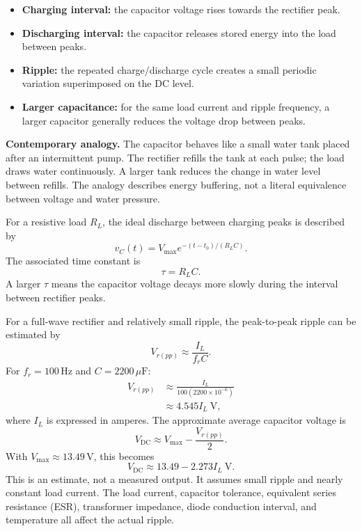 \documentclass[journal,12pt,twocolumn]{IEEEtran}
\begin{document}
\begin{itemize}[leftmargin=1.5em]
    \item \textbf{Charging interval:} the capacitor voltage rises
    towards the rectifier peak.
    \item \textbf{Discharging interval:} the capacitor releases stored
    energy into the load between peaks.
    \item \textbf{Ripple:} the repeated charge/discharge cycle creates
    a small periodic variation superimposed on the DC level.
    \item \textbf{Larger capacitance:} for the same load current and
    ripple frequency, a larger capacitor generally reduces the
    voltage drop between peaks.
\end{itemize}

\textbf{Contemporary analogy.} The capacitor behaves like a small
water tank placed after an intermittent pump. The rectifier refills
the tank at each pulse; the load draws water continuously. A larger
tank reduces the change in water level between refills. The analogy
describes energy buffering, not a literal equivalence between
voltage and water pressure.

For a resistive load $R_L$, the ideal discharge between charging
peaks is described by
\begin{equation}
    \boxed{v_C(t)=V_{\max}
    e^{-(t-t_0)/(R_LC)}.}
    \label{eq:cap-discharge}
\end{equation}
The associated time constant is
\begin{equation}
    \boxed{\tau=R_LC.}
    \label{eq:rc-time}
\end{equation}
A larger $\tau$ means the capacitor voltage decays more slowly
during the interval between rectifier peaks.

For a full-wave rectifier and relatively small ripple, the
peak-to-peak ripple can be estimated by
\begin{equation}
    \boxed{V_{r(pp)}\approx\frac{I_L}{f_rC}.}
    \label{eq:ripple-estimate}
\end{equation}
For $f_r=100\,\mathrm{Hz}$ and $C=2200\,\mu\mathrm{F}$:
\begin{align}
    V_{r(pp)}
    &\approx \frac{I_L}{100(2200\times10^{-6})}\\
    &\approx 4.545 I_L\ \mathrm{V},
\end{align}
where $I_L$ is expressed in amperes. The approximate average
capacitor voltage is
\begin{equation}
    \boxed{V_{\mathrm{DC}}\approx
    V_{\max}-\frac{V_{r(pp)}}{2}.}
    \label{eq:cap-average}
\end{equation}
With $V_{\max}\approx13.49\,\mathrm{V}$, this becomes
\begin{equation}
    V_{\mathrm{DC}}\approx13.49-2.273I_L\ \mathrm{V}.
\end{equation}
This is an estimate, not a measured output. It assumes small ripple
and nearly constant load current. The load current, capacitor
tolerance, equivalent series resistance (ESR), transformer
impedance, diode conduction interval, and temperature all affect
the actual ripple.
\end{document}
